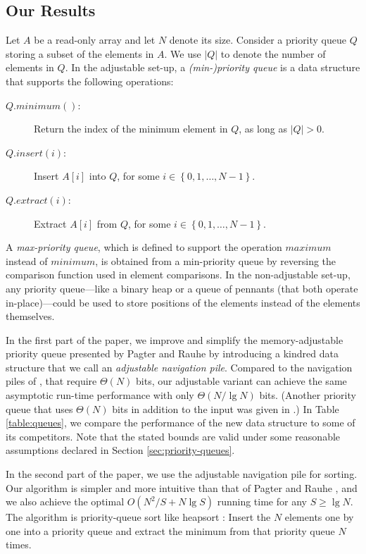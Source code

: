 \documentclass[final,onetabnum,onefignum,onethmnum]{siamltex}
\newcommand{\Minimum}{\mbox{$\mathit{minimum}$}}
\newcommand{\Maximum}{\mbox{$\mathit{maximum}$}}
\newcommand{\Insert}{\mbox{$\mathit{insert}$}}
\newcommand{\Extract}{\mbox{$\mathit{extract}$}}
\newcommand{\set}[1]{\left\{#1\right\}}
\begin{document}
\subsection{Our Results} 
Let $A$ be a read-only array and let $N$ denote its size.  Consider
a priority queue $Q$ storing a subset of the elements in $A$.  We use
$|Q|$ to denote the number of elements in $Q$. In the adjustable
set-up, a \emph{(min-)priority queue} is a data structure that
supports the following operations:
\begin{description}
\item[$Q.\Minimum{}()$:] Return the index of the minimum element
  in $Q$, as long as $|Q| > 0$.
\item[$Q.\Insert{}(i)$:] Insert  $A[i]$ into $Q$, for some $i
  \in\set{0,1,\ldots,N - 1}$.
\item[$Q.\Extract{}(i)$:] Extract $A[i]$ from $Q$, for some $i
  \in\set{0,1,\ldots,N - 1}$.
\end{description}
A \emph{max-priority queue}, which is defined to support the operation
$\Maximum{}$ instead of $\Minimum{}$, is obtained from a min-priority
queue by reversing the comparison function used in element
comparisons.
In the non-adjustable set-up, any priority queue---like a binary heap
\cite{Wil64} or a queue of pennants \cite{CMP88} (that both operate
in-place)---could be used to store positions of the elements instead
of the elements themselves.

In the first part of the paper, we improve and simplify the
memory-adjustable priority queue presented by Pagter and Rauhe
\cite{PR98} by introducing a kindred data structure that we call an
\emph{adjustable navigation pile}.  Compared to the navigation piles of
\cite{KV03}, that require $\Theta(N)$ bits, our adjustable variant can
achieve the same asymptotic run-time performance with only $\Theta(N/\lg N)$
bits. (Another priority queue that uses $\Theta(N)$ bits in addition
to the input was given in \cite{Elm03}.)  In Table
\ref{table:queues}, we compare the performance of the new data
structure to some of its competitors. Note that the stated bounds are
valid under some reasonable assumptions declared in Section \ref{sec:priority-queues}.

In the second part of the paper, we use the adjustable navigation pile
for sorting.  Our algorithm is simpler and more intuitive than that of
Pagter and Rauhe \cite{PR98}, and we also achieve the optimal
$O(N^2/S + N \lg{} S)$ running time for any $S \geq \lg{} N$.  
The algorithm is priority-queue sort like
heapsort \cite{Wil64}: Insert the $N$ elements one by one into a
priority queue and extract the minimum from that priority queue $N$
times.
\end{document}
